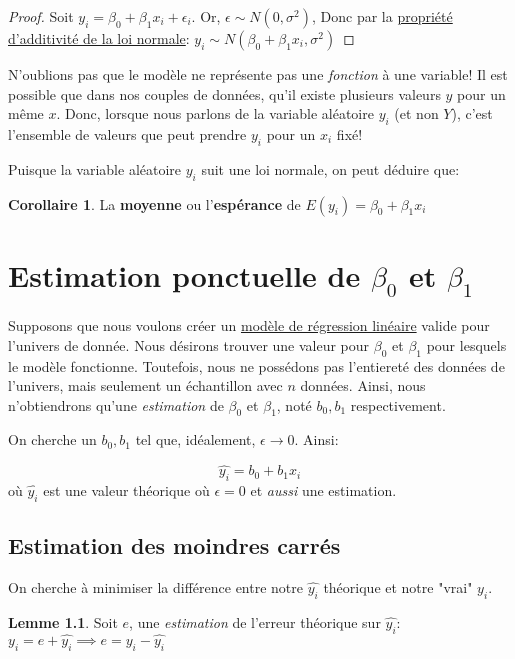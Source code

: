\documentclass[12pt]{book}
\theoremstyle{definition}
\newtheorem{corollary}{Corollaire}[theorem]
\newtheorem{lemma}[theorem]{Lemme}
\begin{document}
\begin{proof}
    Soit $y_i = \beta_0 + \beta_1x_i + \epsilon_i$. Or, $\epsilon \sim N(0, \sigma^2)$,
    Donc par la \hyperref[def:loi_normale_additivite]{propriété d'additivité de la loi normale}: $y_i \sim N(\beta_0 + \beta_1x_i, \sigma^2)$
\end{proof}

N'oublions pas que le modèle ne représente pas une \textit{fonction} à une variable! Il est possible que dans nos couples de données, qu'il existe 
plusieurs valeurs $y$ pour un même $x$. Donc, lorsque nous parlons de la variable aléatoire $y_i$ (et non $Y$), c'est l'ensemble de valeurs que peut 
prendre $y_i$ pour un $x_i$ fixé!

Puisque la variable aléatoire $y_i$ suit une loi normale, on peut déduire que:
\begin{corollary}
    \label{def:y_moyenne}
    La \textbf{moyenne} ou l'\textbf{espérance} de $E(y_i) = \beta_0 + \beta_1x_i$
\end{corollary}


\chapter{Estimation ponctuelle de $\beta_0$ et $\beta_1$}
Supposons que nous voulons créer un \hyperref[def:regression_lineaire]{modèle de régression linéaire} valide pour l'univers de donnée.
Nous désirons trouver une valeur pour $\beta_0$ et $\beta_1$ pour lesquels le modèle fonctionne. Toutefois, nous ne possédons pas 
l'entiereté des données de l'univers, mais seulement un échantillon avec $n$ données. Ainsi, nous n'obtiendrons qu'une \textit{estimation}
de $\beta_0$ et  $\beta_1$, noté $b_0, b_1$ respectivement.

On cherche un $b_0, b_1$ tel que, idéalement, $\epsilon \to 0$. Ainsi:

$$ \hat{y_i} = b_0 + b_1x_i$$ où $\hat{y_i}$ est une valeur théorique où $\epsilon = 0$ et \textit{aussi} une estimation.

\section{Estimation des moindres carrés}
On cherche à minimiser la différence entre notre $\hat{y_i}$ théorique et notre "vrai" $y_i$.
\begin{lemma}
    \label{lem:estimation_erreur}
    Soit $e$, une \textit{estimation } de l'erreur théorique sur $\hat{y_i}$:
    $y_i = e + \hat{y_i} \implies e = y_i - \hat{y_i}$
\end{lemma}
\end{document}
